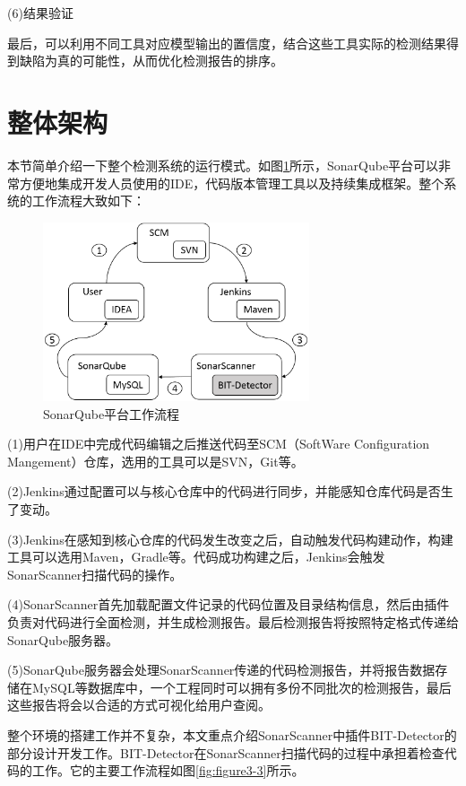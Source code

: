 (6)结果验证

最后，可以利用不同工具对应模型输出的置信度，结合这些工具实际的检测结果得到缺陷为真的可能性，从而优化检测报告的排序。

\section{整体架构}

本节简单介绍一下整个检测系统的运行模式。如图\ref{fig:figure3-2}所示，SonarQube平台可以非常方便地集成开发人员使用的IDE，代码版本管理工具以及持续集成框架。整个系统的工作流程大致如下：

\begin{figure}
	\centering
	\includegraphics[width=0.70\textwidth]{figures/sonarqube3-2}
	\caption{SonarQube平台工作流程}\label{fig:figure3-2}
\end{figure}


(1)用户在IDE中完成代码编辑之后推送代码至SCM（SoftWare Configuration Mangement）仓库，选用的工具可以是SVN，Git等。

(2)Jenkins通过配置可以与核心仓库中的代码进行同步，并能感知仓库代码是否生了变动。

(3)Jenkins在感知到核心仓库的代码发生改变之后，自动触发代码构建动作，构建工具可以选用Maven，Gradle等。代码成功构建之后，Jenkins会触发SonarScanner扫描代码的操作。

(4)SonarScanner首先加载配置文件记录的代码位置及目录结构信息，然后由插件负责对代码进行全面检测，并生成检测报告。最后检测报告将按照特定格式传递给SonarQube服务器。

(5)SonarQube服务器会处理SonarScanner传递的代码检测报告，并将报告数据存储在MySQL等数据库中，一个工程同时可以拥有多份不同批次的检测报告，最后这些报告将会以合适的方式可视化给用户查阅。

整个环境的搭建工作并不复杂，本文重点介绍SonarScanner中插件BIT-Detector的部分设计开发工作。BIT-Detector在SonarScanner扫描代码的过程中承担着检查代码的工作。它的主要工作流程如图\ref{fig:figure3-3}所示。

